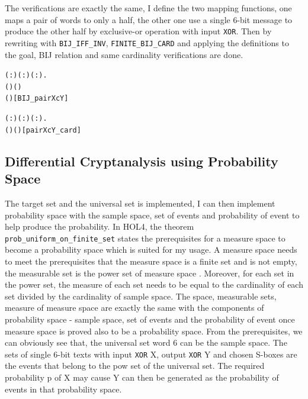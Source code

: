 \documentclass{article}
\begin{document}
The verifications are exactly the same, I define the two mapping functions, one maps a pair of words to only a half, the
other one use a single 6-bit message to produce the other half by exclusive-or operation with input \verb|XOR|. Then by rewriting
with \verb|BIJ_IFF_INV|, \verb|FINITE_BIJ_CARD| and applying the definitions to the goal, BIJ relation and same cardinality
verifications are done.

\begin{alltt}
  \HOLTokenTurnstile{} \HOLSymConst{\HOLTokenForall{}}( :) ( :) ( :).
      ( ) (   )
       (   )\hfill{[BIJ_pairXcY]}
\end{alltt}

\begin{alltt}
  \HOLTokenTurnstile{} \HOLSymConst{\HOLTokenForall{}}( :) ( :) ( :).
      (   ) \HOLSymConst{=}  (   )\hfill{[pairXcY_card]}
\end{alltt}

\subsection{Differential Cryptanalysis using Probability Space}
The target set and the universal set is implemented, I can then implement probability space with the sample space,
set of events and probability of event to help produce
the probability. In HOL4, the theorem \verb|prob_uniform_on_finite_set| states the prerequisites for a measure space
to become a probability space which is suited for my usage. A measure space needs to meet the prerequisites that the measure
space is a finite set and is not empty, the measurable set is the
power set of measure space . Moreover, for each set in the power set, the measure of each set needs to be equal to the
cardinality of each set divided by the cardinality of sample space.
The space, measurable sets, measure of measure space are exactly the same with the components of probability
space - sample space, set of events and the probability of event once measure space is proved also to be a probability space.
From the prerequisites, we can obviously see that, the universal set word 6 can be the sample space.
The sets of single 6-bit texts with input \verb|XOR| X, output \verb|XOR| Y and chosen S-boxes are the events that belong to the
pow set of the universal set.
The required probability p of X may cause Y can then be generated as the probability of events in that probability space.
\end{document}

